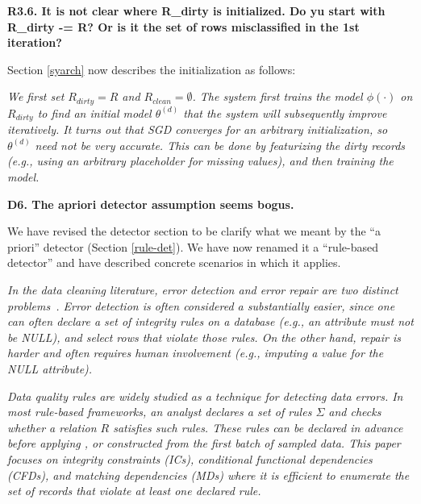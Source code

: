 \vspace{0.5em}

\noindent\textbf{R3.6. It is not clear where R\_dirty is initialized. Do yu start with R\_dirty -= R? Or is it the set of rows misclassified in the 1st iteration?}

\noindent Section \ref{syarch} now describes the initialization as follows:

\emph{We first set $R_{dirty} = R$ and $R_{clean} = \emptyset$.
The system first trains the model $\phi(\cdot)$ on $R_{dirty}$ to find an initial model $\theta^{(d)}$ that the system will subsequently improve iteratively.
It turns out that SGD converges for an arbitrary initialization, so $\theta^{(d)}$ need not be very accurate. This can be done by featurizing the dirty records (e.g., using an arbitrary placeholder for missing values), and then training the model.}

\vspace{0.5em}

\noindent\textbf{D6. The apriori detector assumption seems bogus.} 

\noindent  We have revised the detector section to be clarify what we meant by the ``a priori'' detector (Section \ref{rule-det}). We have now renamed it a ``rule-based detector'' and have described concrete scenarios in which it applies.

\vspace{0.5em}

\emph{In the data cleaning literature, error detection and error repair are two distinct problems~\cite{DBLP:series/synthesis/2012Fan, Dasu:2003:EDM:861869, rahm2000data}.
Error detection is often considered a substantially easier, since one can often declare a set of integrity rules on a database (e.g., an attribute must not be NULL), and select rows that violate those rules.
On the other hand, repair is harder and often requires human involvement (e.g., imputing a value for the NULL attribute).}

\vspace{0.5em}

\emph{Data quality rules are widely studied as a technique for detecting data errors.
In most rule-based frameworks, an analyst declares a set of rules $\Sigma$ and checks whether a relation $R$ satisfies such rules.
These rules can be declared in advance before applying \sys, or constructed from the first batch of sampled data.
This paper focuses on integrity constraints (ICs), conditional functional dependencies (CFDs), and matching dependencies (MDs) where it is efficient to enumerate the set of records that violate at least one declared rule. }


